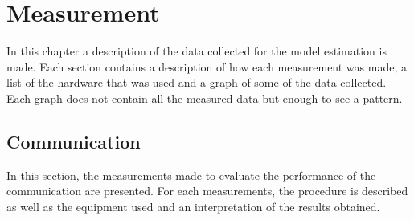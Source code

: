 \chapter{Measurement}\label{cha:measurement}

In this chapter a description of the data collected for the model estimation is made. Each section contains a description of how each measurement was made, a list of the hardware that was used and a graph of some of the data collected. Each graph does not contain all the measured data but enough to see a pattern. 




%






\section{Communication}

In this section, the measurements made to evaluate the performance of the communication are presented. For each measurements, the procedure is described as well as the equipment used and an interpretation of the results obtained.



